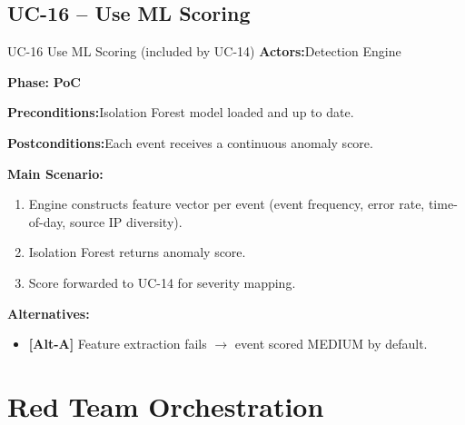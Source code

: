 \documentclass[12pt,a4paper]{report}
\newcommand{\ucfield}[2]{%
    \noindent\textbf{\color{helixpurplemid}#1:}\quad #2\par\medskip
}
\newcommand{\ucphase}[1]{%
    \noindent\textbf{\color{helixpurplemid}Phase:}\quad%
    \ifstrequal{#1}{PoC}{\textcolor{helixteal}{\textbf{PoC}}}{\textcolor{helixamber}{\textbf{Future MVP}}}%
    \par\medskip
}
\begin{document}
\section{UC-16 -- Use ML Scoring}
\begin{ucbox}{UC-16 \quad Use ML Scoring \textnormal{(included by UC-14)}}
    \ucfield{Actors}{Detection Engine}
    \ucphase{PoC}
    \ucfield{Preconditions}{Isolation Forest model loaded and up to date.}
    \ucfield{Postconditions}{Each event receives a continuous anomaly score.}
    \textbf{\color{helixpurplemid}Main Scenario:}
    \begin{enumerate}
        \item Engine constructs feature vector per event (event frequency, error rate, time-of-day, source IP diversity).
        \item Isolation Forest returns anomaly score.
        \item Score forwarded to UC-14 for severity mapping.
    \end{enumerate}
    \textbf{\color{helixpurplemid}Alternatives:}
    \begin{itemize}
        \item \textbf{[Alt-A]} Feature extraction fails $\rightarrow$ event scored MEDIUM by default.
    \end{itemize}
\end{ucbox}

\chapter{Red Team Orchestration}
\end{document}
